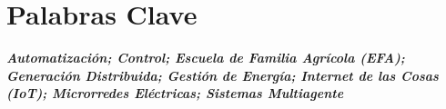 \cleardoublepage                              
\chapter*{Palabras Clave}


\textbf{\textsl{Automatización; Control; Escuela de Familia Agrícola (EFA); Generación Distribuida; Gestión de Energía; Internet de las Cosas (IoT); Microrredes Eléctricas; Sistemas Multiagente}}












